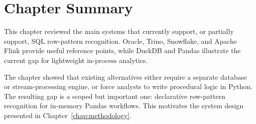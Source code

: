 \section{Chapter Summary}
\label{sec:related-summary}

This chapter reviewed the main systems that currently support, or
partially support, SQL row-pattern recognition.  Oracle, Trino,
Snowflake, and Apache Flink provide useful reference points, while
DuckDB and Pandas illustrate the current gap for lightweight
in-process analytics.

The chapter showed that existing alternatives either require a
separate database or stream-processing engine, or force analysts to
write procedural logic in Python.  The resulting gap is a scoped but
important one: declarative row-pattern recognition for in-memory
Pandas workflows.  This motivates the system design presented in
Chapter~\ref{chap:methodology}.

